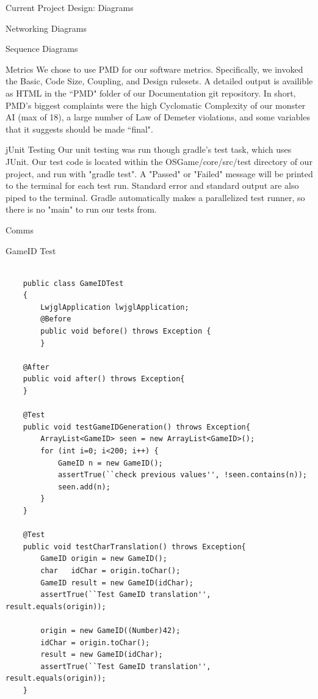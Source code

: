 \documentclass[12pt]{report}
\begin{document}
\begin{chapter}{Current Project Design: Diagrams}
\begin{section}{Networking Diagrams}
\begin{subsection}{Sequence Diagrams}
	\end{subsection}
   \end{section}
 \end{chapter}
 
  \begin{chapter}{Metrics}
  	We chose to use PMD for our software metrics. Specifically, we invoked the Basic, Code Size, Coupling, and Design rulesets. A detailed output is availible as HTML in the ``PMD" folder of our Documentation git repository. In short, PMD's biggest complaints were the high Cyclomatic Complexity of our monster AI (max of 18), a large number of Law of Demeter violations, and some variables that it suggests should be made ``final".
  \end{chapter}
 
 
 \begin{chapter}{jUnit Testing}
 	Our unit testing was run though gradle's test task, which uses JUnit. Our test code is located within the OSGame/core/src/test directory of our project, and run with "gradle test". A "Passed" or "Failed" message will be printed to the terminal for each test run. Standard error and standard output are also piped to the terminal. Gradle automatically makes a parallelized test runner, so there is no "main" to run our tests from.
 	
  \begin{section}{Comms}
   \begin{subsection}{GameID Test}
    \begin{lstlisting}

    public class GameIDTest
    {
    	LwjglApplication lwjglApplication;
    	@Before
    	public void before() throws Exception {
    	}

    @After
    public void after() throws Exception{
    }

    @Test
    public void testGameIDGeneration() throws Exception{
        ArrayList<GameID> seen = new ArrayList<GameID>();
        for (int i=0; i<200; i++) {
            GameID n = new GameID();
            assertTrue(``check previous values'', !seen.contains(n));
            seen.add(n);
        }
    }

    @Test
    public void testCharTranslation() throws Exception{
        GameID origin = new GameID();
        char   idChar = origin.toChar();
        GameID result = new GameID(idChar);
        assertTrue(``Test GameID translation'', result.equals(origin));

        origin = new GameID((Number)42);
        idChar = origin.toChar();
        result = new GameID(idChar);
        assertTrue(``Test GameID translation'', result.equals(origin));
    }



\end{lstlisting}
\end{subsection}
\end{section}
\end{chapter}
\end{document}
